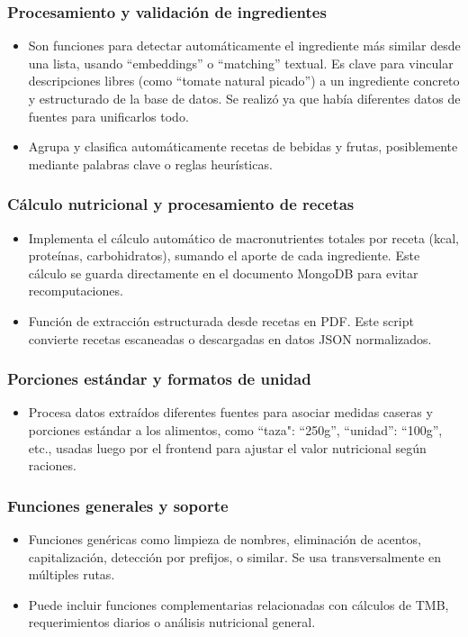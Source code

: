\subsubsection*{Procesamiento y validación de ingredientes}
\begin{itemize}
    \item Son funciones para detectar automáticamente el ingrediente más similar desde una lista, usando ``embeddings'' o ``matching'' textual.
    Es clave para vincular descripciones libres (como “tomate natural picado”) a un ingrediente concreto y estructurado de la base de datos. Se realizó ya que había diferentes datos de fuentes para unificarlos todo.
    \item Agrupa y clasifica automáticamente recetas de bebidas y frutas, posiblemente mediante palabras clave o reglas heurísticas.
\end{itemize}

\subsubsection*{Cálculo nutricional y procesamiento de recetas}
\begin{itemize}
    \item Implementa el cálculo automático de macronutrientes totales por receta (kcal, proteínas, carbohidratos), sumando el aporte de cada ingrediente.
    Este cálculo se guarda directamente en el documento MongoDB para evitar recomputaciones.
    \item Función de extracción estructurada desde recetas en PDF. Este script convierte recetas escaneadas o descargadas en datos JSON normalizados.
\end{itemize}

\subsubsection*{Porciones estándar y formatos de unidad}
\begin{itemize}
    \item Procesa datos extraídos diferentes fuentes para asociar medidas caseras y porciones estándar a los alimentos, como ``taza": ``250g'', ``unidad'': ``100g'', etc., usadas luego por el frontend para ajustar el valor nutricional según raciones.
    
\end{itemize}
\subsubsection*{Funciones generales y soporte}
\begin{itemize}
    \item Funciones genéricas como limpieza de nombres, eliminación de acentos, capitalización, detección por prefijos, o similar. Se usa transversalmente en múltiples rutas.
    \item Puede incluir funciones complementarias relacionadas con cálculos de TMB, requerimientos diarios o análisis nutricional general.
\end{itemize}

